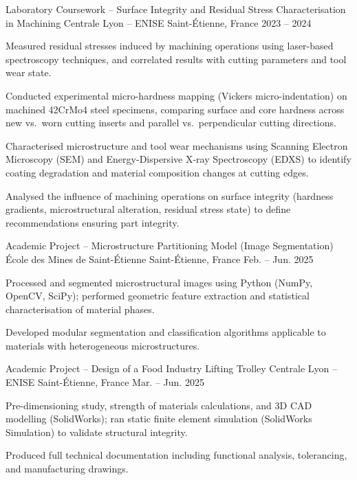 \documentclass[11pt, a4paper]{awesome-cv}
\begin{document}
\begin{cventries}
  \cventry
    {Laboratory Coursework – Surface Integrity and Residual Stress Characterisation in Machining}
    {Centrale Lyon -- ENISE}
    {Saint-\'Etienne, France}
    {2023 -- 2024}
    {
      \begin{cvitems}
        \item Measured residual stresses induced by machining operations using laser-based spectroscopy techniques, and correlated results with cutting parameters and tool wear state.
        \item Conducted experimental micro-hardness mapping (Vickers micro-indentation) on machined 42CrMo4 steel specimens, comparing surface and core hardness across new vs.\ worn cutting inserts and parallel vs.\ perpendicular cutting directions.
        \item Characterised microstructure and tool wear mechanisms using Scanning Electron Microscopy (SEM) and Energy-Dispersive X-ray Spectroscopy (EDXS) to identify coating degradation and material composition changes at cutting edges.
        \item Analysed the influence of machining operations on surface integrity (hardness gradients, microstructural alteration, residual stress state) to define recommendations ensuring part integrity.
      \end{cvitems}
    }

  \cventry
    {Academic Project – Microstructure Partitioning Model (Image Segmentation)}
    {\'Ecole des Mines de Saint-\'Etienne}
    {Saint-Étienne, France}
    {Feb. -- Jun. 2025}
    {
      \begin{cvitems}
        \item Processed and segmented microstructural images using Python (NumPy, OpenCV, SciPy); performed geometric feature extraction and statistical characterisation of material phases.
        \item Developed modular segmentation and classification algorithms applicable to materials with heterogeneous microstructures.
      \end{cvitems}
    }

  \cventry
    {Academic Project – Design of a Food Industry Lifting Trolley}
    {Centrale Lyon -- ENISE}
    {Saint-\'Etienne, France}
    {Mar. -- Jun. 2025}
    {
      \begin{cvitems}
        \item Pre-dimensioning study, strength of materials calculations, and 3D CAD modelling (SolidWorks); ran static finite element simulation (SolidWorks Simulation) to validate structural integrity.
        \item Produced full technical documentation including functional analysis, tolerancing, and manufacturing drawings.
      \end{cvitems}
    }


\end{cventries}
\end{document}
